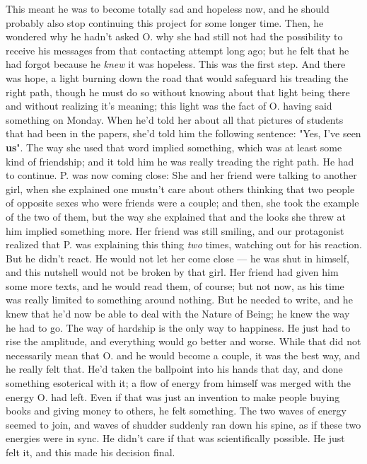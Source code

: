 This meant he was to become totally sad and hopeless now, and he should probably also stop continuing this project for some longer time. 
Then, he wondered why he hadn't asked O. why she had still not had the possibility to receive his messages from that contacting attempt long ago; but he felt that he had forgot because he \emph{knew} it was hopeless. This was the first step. 
And there was hope, a light burning down the road that would safeguard his treading the right path, though he must do so without knowing about that light being there and without realizing it's meaning; this light was the fact of O. having said something on Monday. 
When he'd told her about all that pictures of students that had been in the papers, she'd told him the following sentence: "Yes, I've seen \textbf{us}". The way she used that word implied something, which was at least some kind of friendship; and it told him he was really treading the right path. 
He had to continue. 
P. was now coming close: She and her friend were talking to another girl, when she explained one mustn't care about others thinking that two people of opposite sexes who were friends were a couple; and then, she took the example of the two of them, but the way she explained that and the looks she threw at him implied something more. 
Her friend was still smiling, and our protagonist realized that P. was explaining this thing \emph{two} times, watching out for his reaction. 
But he didn't react. 
He would not let her come close --- he was shut in himself, and this nutshell would not be broken by that girl. 
Her friend had given him some more texts, and he would read them, of course; but not now, as his time was really limited to something around nothing. 
But he needed to write, and he knew that he'd now be able to deal with the Nature of Being; he knew the way he had to go. 
The way of hardship is the only way to happiness. 
He just had to rise the amplitude, and everything would go better and worse. While that did not necessarily mean that O. and he would become a couple, it was the best way, and he really felt that. 
He'd taken the ballpoint into his hands that day, and done something esoterical with it; a flow of energy from himself was merged with the energy O. had left. Even if that was just an invention to make people buying books and giving money to others, he felt something. 
The two waves of energy seemed to join, and waves of shudder suddenly ran down his spine, as if these two energies were in sync. He didn't care if that was scientifically possible. He just felt it, and this made his decision final. 
